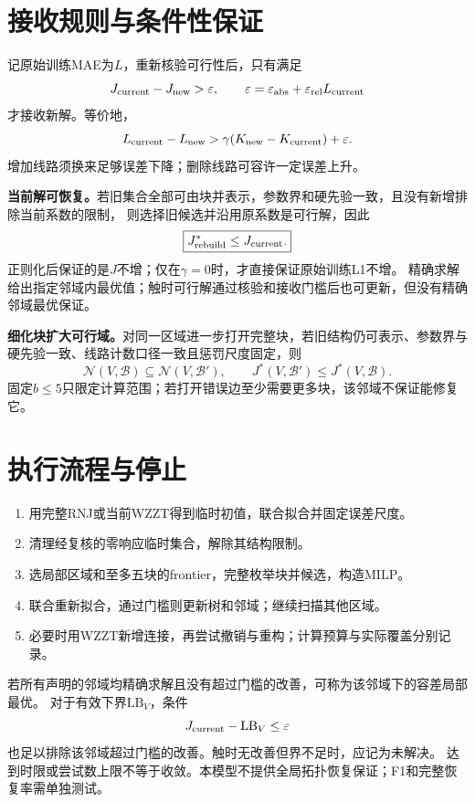 \documentclass[UTF8,a4paper,11pt,fontset=windows]{ctexart}
\begin{document}
\section{接收规则与条件性保证}
记原始训练MAE为$L$，重新核验可行性后，只有满足
\begin{equation}
 J_{\rm current}-J_{\rm new}>\varepsilon,\qquad
 \varepsilon=\varepsilon_{\rm abs}+\varepsilon_{\rm rel}L_{\rm current}
\end{equation}
才接收新解。等价地，
\begin{equation}
 L_{\rm current}-L_{\rm new}>
 \gamma(K_{\rm new}-K_{\rm current})+\varepsilon.
\end{equation}
增加线路须换来足够误差下降；删除线路可容许一定误差上升。

\textbf{当前解可恢复。}若旧集合全部可由块并表示，参数界和硬先验一致，且没有新增排除当前系数的限制，
则选择旧候选并沿用原系数是可行解，因此
\begin{equation}
 \boxed{J^*_{\rm rebuild}\le J_{\rm current}.}
\end{equation}
正则化后保证的是$J$不增；仅在$\gamma=0$时，才直接保证原始训练L1不增。
精确求解给出指定邻域内最优值；触时可行解通过核验和接收门槛后也可更新，但没有精确邻域最优保证。

\textbf{细化块扩大可行域。}对同一区域进一步打开完整块，若旧结构仍可表示、参数界与硬先验一致、线路计数口径一致且惩罚尺度固定，则
\begin{equation}
 \mathcal N(V,\mathcal B)\subseteq\mathcal N(V,\mathcal B'),\qquad
 J^*(V,\mathcal B')\le J^*(V,\mathcal B).
\end{equation}
固定$b\le5$只限定计算范围；若打开错误边至少需要更多块，该邻域不保证能修复它。

\section{执行流程与停止}
\begin{enumerate}
 \item 用完整RNJ或当前WZZT得到临时初值，联合拟合并固定误差尺度。
 \item 清理经复核的零响应临时集合，解除其结构限制。
 \item 选局部区域和至多五块的frontier，完整枚举块并候选，构造MILP。
 \item 联合重新拟合，通过门槛则更新树和邻域；继续扫描其他区域。
 \item 必要时用WZZT新增连接，再尝试撤销与重构；计算预算与实际覆盖分别记录。
\end{enumerate}
若所有声明的邻域均精确求解且没有超过门槛的改善，可称为该邻域下的容差局部最优。
对于有效下界$\mathrm{LB}_V$，条件
\begin{equation}
 J_{\rm current}-\mathrm{LB}_V\le\varepsilon
\end{equation}
也足以排除该邻域超过门槛的改善。触时无改善但界不足时，应记为未解决。
达到时限或尝试数上限不等于收敛。本模型不提供全局拓扑恢复保证；F1和完整恢复率需单独测试。
\end{document}
